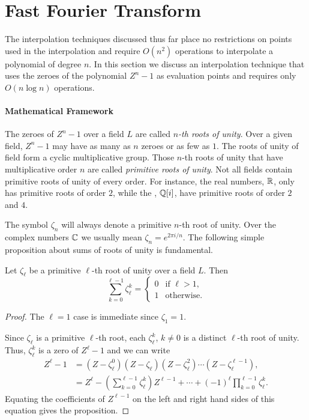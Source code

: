 \section{Fast Fourier Transform}
\label{Poly:FFT:Sec}

The interpolation techniques discussed thus far place no restrictions
on points used in the interpolation and require $O(n^2)$ operations to
interpolate a polynomial of degree $n$.  In this section we discuss an
interpolation technique that uses the zeroes of the polynomial $Z^n -
1$ as evaluation points and requires only $O(n \log n)$ operations.

\paragraph{Mathematical Framework}

The zeroes of $Z^n -1$ over a field $L$ are called {\em $n$-th roots
of unity}.  Over a given field, $Z^n -1$ may
have as many as $n$ zeroes or as few as $1$.  The roots of unity of
field form a cyclic multiplicative group.  Those $n$-th roots of
unity that have multiplicative order $n$ are called {\em primitive
roots of unity}. Not all fields contain
primitive roots of unity of every order.  For instance, the real
numbers, $\mathbb{R}$, only has primitive roots of order $2$, while the
, $\mathbb{Q}[i]$, have primitive roots of order $2$
and $4$.

The symbol $\zeta_n$ will always denote a primitive $n$-th root of
unity.  Over the complex numbers $\mathbb{C}$ we usually mean $\zeta_n =
e^{2\pi i/n}$.  The following simple proposition about sums of roots
of unity is fundamental.

\begin{proposition}\label{Simple:Root:Ident:Prop}
Let $\zeta_{\ell}$ be a primitive $\ell$-th root of unity over a
field $L$.  Then
\[
\sum_{k=0}^{\ell-1} \zeta_{\ell}^k =
\begin {cases}
0 & \text{if $\ell > 1$,} \\
1 & \text{otherwise.}
\end{cases}
\]
\end{proposition}

\begin{proof}
The $\ell = 1$ case is immediate since $\zeta_1 = 1$.

Since $\zeta_{\ell}$ is a primitive $\ell$-th root, each $\zeta_{\ell}^k$, $k \not= 0$ is a distinct
$\ell$-th root of unity.  Thus, $\zeta_{\ell}^k$ is a zero of
$Z^{\ell} -1$ and we can write
\[
\begin{aligned}
Z^{\ell} - 1 & = (Z - \zeta_{\ell}^0)(Z - \zeta_{\ell})(Z - \zeta_{\ell}^2)
\cdots (Z - \zeta_{\ell}^{\ell-1}), \\
& = Z^{\ell} - \left(\sum_{k=0}^{\ell-1} \zeta_{\ell}^k\right) Z^{\ell -1}
+ \cdots + (-1)^{\ell} \prod_{k=0}^{\ell-1} \zeta_{\ell}^k.
\end{aligned}
\]
Equating the coefficients of $Z^{\ell-1}$ on the left and right hand
sides of this equation gives the proposition.
\end{proof}

